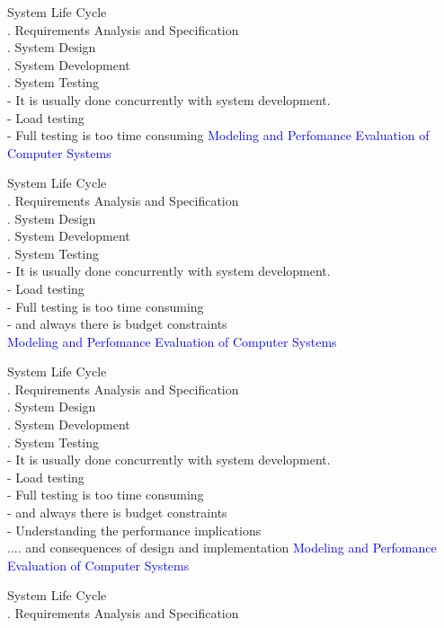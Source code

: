 \documentclass[svgnames]{beamer}
\begin{document}
\raggedright
\! System Life Cycle\\
. Requirements Analysis and Specification\\
. System Design\\
. System Development\\
. System Testing\\[16pt]
 - It is usually done concurrently with system development.\\
 - Load testing \\
 - Full testing is too time consuming 
\newpage
\textcolor{blue}{Modeling and Perfomance Evaluation of Computer Systems} \\[38pt]
\raggedright
\! System Life Cycle\\
. Requirements Analysis and Specification\\
. System Design\\
. System Development\\
. System Testing\\[16pt]
 - It is usually done concurrently with system development.\\
 - Load testing \\
 - Full testing is too time consuming  \\
 - and always there is budget constraints\\
\newpage
\textcolor{blue}{Modeling and Perfomance Evaluation of Computer Systems} \\[38pt]
\raggedright
\! System Life Cycle\\
. Requirements Analysis and Specification\\
. System Design\\
. System Development\\
. System Testing\\[16pt]
 - It is usually done concurrently with system development.\\
 - Load testing \\
 - Full testing is too time consuming  \\
 - and always there is budget constraints\\
 - Understanding the performance implications\\ 
 .... and consequences of design and implementation
\newpage
\textcolor{blue}{Modeling and Perfomance Evaluation of Computer Systems} \\[38pt]
\raggedright
\! System Life Cycle\\
. Requirements Analysis and Specification\\
\end{document}

